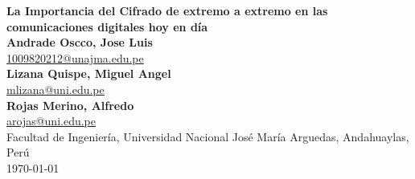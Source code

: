 \documentclass[spanish,12pt,a4paper]{article}
\begin{document}
	
	\begin{flushright}
		{\LARGE \textbf{La Importancia del Cifrado de extremo a extremo en las comunicaciones digitales hoy en día}}\\[1em]
		
		\textbf{Andrade Oscco, Jose Luis}~ \\
		\href{mailto:1009820212@unajma.edu.pe}{1009820212@unajma.edu.pe} \\[0.5em]
		
		\textbf{Lizana Quispe, Miguel Angel}~ \\
		\href{mailto:mlizana@uni.edu.pe}{mlizana@uni.edu.pe} \\[0.5em]
		
		\textbf{Rojas Merino, Alfredo}~ \\
		\href{mailto:arojas@uni.edu.pe}{arojas@uni.edu.pe} \\[0.5em]
		
		Facultad de Ingeniería, Universidad Nacional José María Arguedas, Andahuaylas, Perú \\
		\today
	\end{flushright}
	
	\vspace{2em} 
	
	
\end{document}
